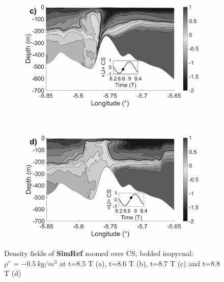 \documentclass[a4paper,12pt]{article}
\begin{document}
\begin{figure}[!h]
\begin{subfigure}{0.5\linewidth}
\includegraphics[width=\textwidth]{RW_J4_11h36_deferl.png}

\end{subfigure}
 ~
\begin{subfigure}{0.5\linewidth}
\includegraphics[width=\textwidth]{RW_J4_13h_gen_mod1.png}

\end{subfigure}
 \caption{Density fields of \textbf{SimRef} zoomed over CS, bolded isopycnal: $\rho'\ =-0.5\ kg/m^3$ at t=8.5 T (a), t=8.6 T (b), t=8.7 T (c) and t=8.8 T (d)}
 \label{CV_ressaut}
\end{figure}
 
\end{document}
